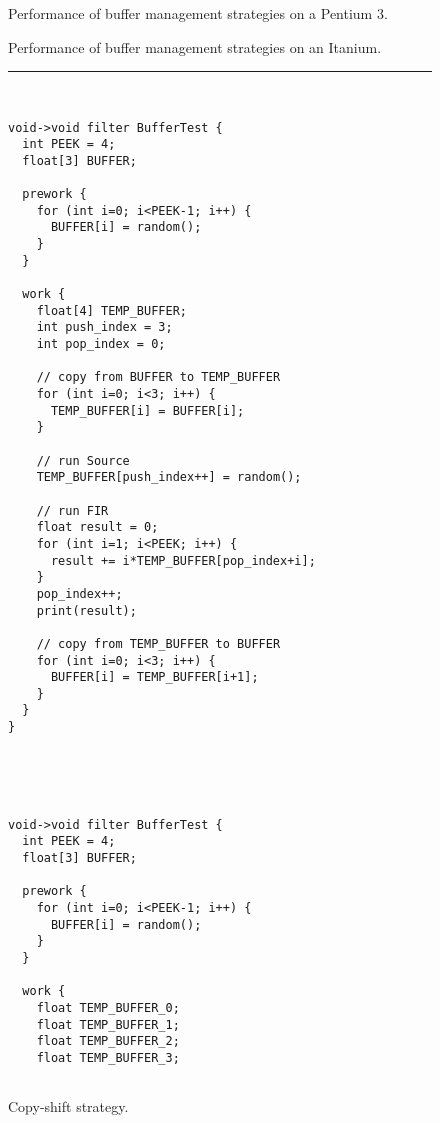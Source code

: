 \clearpage
\begin{figure*}
\begin{minipage}{3.4in}

\caption{Performance of buffer management strategies on a Pentium 3.\protect\label{fig:buf-p3}}
\end{minipage}
\hspace{0.1in}
\begin{minipage}{3.4in}

\caption{Performance of buffer management strategies on an Itanium.\protect\label{fig:buf-itanium}}
\end{minipage}
\vspace{18pt}
\hrule
\begin{minipage}[t]{2.1in}
{\scriptsize
\begin{verbatim}


void->void filter BufferTest {
  int PEEK = 4;
  float[3] BUFFER;

  prework {
    for (int i=0; i<PEEK-1; i++) {
      BUFFER[i] = random();
    }
  }

  work {
    float[4] TEMP_BUFFER;
    int push_index = 3;
    int pop_index = 0;

    // copy from BUFFER to TEMP_BUFFER
    for (int i=0; i<3; i++) {
      TEMP_BUFFER[i] = BUFFER[i];
    }

    // run Source
    TEMP_BUFFER[push_index++] = random();
    
    // run FIR
    float result = 0;
    for (int i=1; i<PEEK; i++) {
      result += i*TEMP_BUFFER[pop_index+i];
    }
    pop_index++;
    print(result);

    // copy from TEMP_BUFFER to BUFFER
    for (int i=0; i<3; i++) {
      BUFFER[i] = TEMP_BUFFER[i+1];
    }
  }
}
\end{verbatim}}

\caption{Copy-shift strategy.\protect\label{fig:copy-shift}}
\end{minipage}
~~\vrule~~
\begin{minipage}[t]{2in}
{\scriptsize
\begin{verbatim}


void->void filter BufferTest {
  int PEEK = 4;
  float[3] BUFFER;

  prework {
    for (int i=0; i<PEEK-1; i++) {
      BUFFER[i] = random();
    }
  }

  work {
    float TEMP_BUFFER_0;
    float TEMP_BUFFER_1;
    float TEMP_BUFFER_2;
    float TEMP_BUFFER_3;


\end{verbatim}}
\end{minipage}
\end{figure*}
